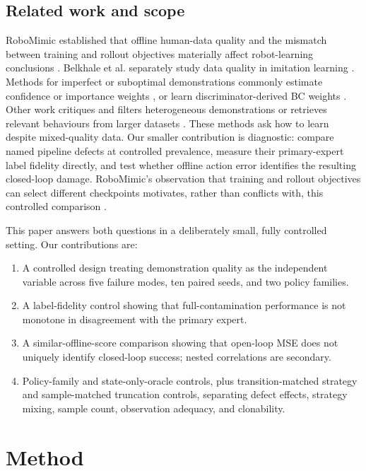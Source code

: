 \documentclass[10pt,twocolumn]{article}
\begin{document}
\subsection{Related work and scope}

RoboMimic established that offline human-data quality and the mismatch between
training and rollout objectives materially affect robot-learning conclusions
\cite{mandlekar2021what}. Belkhale et al. separately study data quality in
imitation learning \cite{belkhale2023data}. Methods for imperfect or
suboptimal demonstrations commonly estimate confidence or importance weights
\cite{wu2019imperfect,wang2021weight}, or learn discriminator-derived BC
weights \cite{xu2022dwbc}. Other work critiques and filters heterogeneous
demonstrations \cite{kuhar2023discern} or retrieves relevant behaviours from
larger datasets \cite{du2023retrieval}. These methods ask how to learn despite
mixed-quality data. Our smaller contribution is diagnostic: compare named
pipeline defects at controlled prevalence, measure their primary-expert label
fidelity directly, and test whether offline action error identifies the
resulting closed-loop damage. RoboMimic's observation that training and
rollout objectives can select different checkpoints motivates, rather than
conflicts with, this controlled comparison \cite{mandlekar2021what}.

This paper answers both questions in a deliberately small, fully controlled
setting. Our contributions are:

\begin{enumerate}\itemsep2pt
\item A controlled design treating demonstration quality as the independent
variable across five failure modes, ten paired seeds, and two policy families.
\item A label-fidelity control showing that full-contamination performance is
not monotone in disagreement with the primary expert.
\item A similar-offline-score comparison showing that open-loop MSE does not
uniquely identify closed-loop success; nested correlations are secondary.
\item Policy-family and state-only-oracle controls, plus transition-matched
strategy and sample-matched truncation controls, separating defect effects,
strategy mixing, sample count, observation adequacy, and clonability.
\end{enumerate}

\section{Method}
\end{document}
